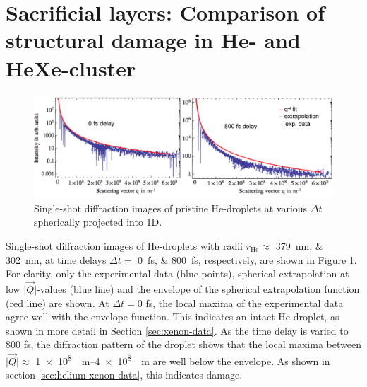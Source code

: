\section{Sacrificial layers: Comparison of structural damage in He- and HeXe-cluster}\label{sec:comparison-of-He-and-HeXe-clusters}
\begin{figure}
	\centering
		\includegraphics[width=1.00\textwidth]{images/results/He-diffraction-patterns.pdf}
	\caption[Single-shot diffraction images of He-droplets at different time delays]{Single-shot diffraction images of pristine He-droplets at various $\Delta t$ spherically projected into 1D.}
	\label{fig:He-diffraction-patterns}
\end{figure}
Single-shot diffraction images of He-droplets with radii $r_{\text{He}}\approx$ \SIlist{379;302}{\nano\meter}, at time delays $\Delta t=$ \SIlist{0;800}{\femto\second}, respectively, are shown in Figure \ref{fig:He-diffraction-patterns}. For clarity, only the experimental data (blue points), spherical extrapolation at low $\lvert\vec{Q}\rvert$-values (blue line) and the envelope of the spherical extrapolation function (red line) are shown. At $\Delta t = 0$ fs, the local maxima of the experimental data agree well with the envelope function. This indicates an intact He-droplet, as shown in more detail in Section \ref{sec:xenon-data}. As the time delay is varied to $800$ fs, the diffraction pattern of the droplet shows that the local maxima between $\lvert\vec{Q}\rvert \approx$ \SIrange[scientific-notation=fixed, fixed-exponent=8]{1e8}{4e8}{\per\meter} are well below the envelope. As shown in section \ref{sec:helium-xenon-data}, this indicates damage.\\[1\baselineskip]
%
